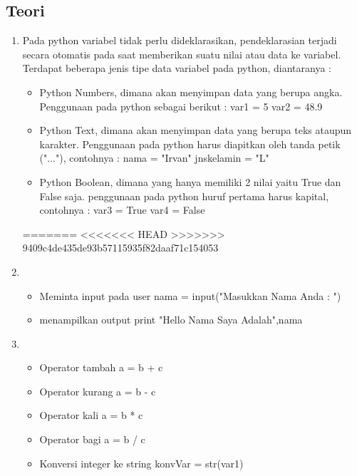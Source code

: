 	\subsection{Teori}
		\begin{enumerate}
			\item Pada python variabel tidak perlu dideklarasikan, pendeklarasian terjadi secara otomatis pada saat memberikan suatu nilai atau data ke variabel. Terdapat beberapa jenis tipe data variabel pada python, diantaranya :
				\begin{itemize}
					\item Python Numbers, dimana akan menyimpan data yang berupa angka. Penggunaan pada python sebagai berikut : 
					var1 = 5
					var2 = 48.9
					
					\item Python Text, dimana akan menyimpan data yang berupa teks ataupun karakter. Penggunaan pada python harus diapitkan oleh tanda petik ("..."), contohnya :
					nama = "Irvan"
					jnskelamin = "L"
					
					\item Python Boolean, dimana yang hanya memiliki 2 nilai yaitu True dan False saja. penggunaan pada python huruf pertama harus kapital, contohnya :
					var3 = True
					var4 = False
				\end{itemize}
=======
<<<<<<< HEAD
>>>>>>> 9409c4de435de93b57115935f82daaf71c154053

			\item \begin{itemize}
					\item Meminta input pada user
					nama = input("Masukkan Nama Anda : ")
					
					\item menampilkan output
					print "Hello Nama Saya Adalah",nama
				\end{itemize}

			\item \begin{itemize}
					\item Operator tambah
					a = b + c
					
					\item Operator kurang
					a = b - c
					
					\item Operator kali
					a = b * c
					
					\item Operator bagi
					a = b / c
					
					\item Konversi integer ke string
					konvVar = str(var1)
					

\end{itemize}
\end{enumerate}
